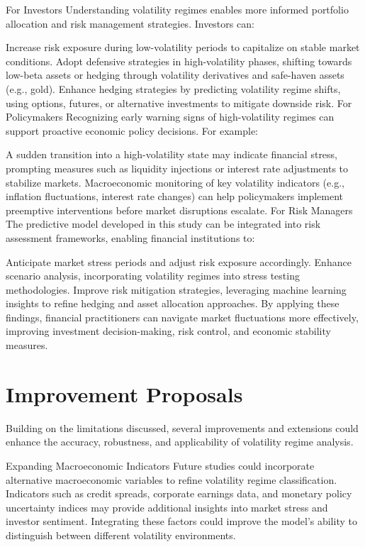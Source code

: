 For Investors
Understanding volatility regimes enables more informed portfolio allocation and risk management strategies. Investors can:

Increase risk exposure during low-volatility periods to capitalize on stable market conditions.
Adopt defensive strategies in high-volatility phases, shifting towards low-beta assets or hedging through volatility derivatives and safe-haven assets (e.g., gold).
Enhance hedging strategies by predicting volatility regime shifts, using options, futures, or alternative investments to mitigate downside risk.
For Policymakers
Recognizing early warning signs of high-volatility regimes can support proactive economic policy decisions. For example:

A sudden transition into a high-volatility state may indicate financial stress, prompting measures such as liquidity injections or interest rate adjustments to stabilize markets.
Macroeconomic monitoring of key volatility indicators (e.g., inflation fluctuations, interest rate changes) can help policymakers implement preemptive interventions before market disruptions escalate.
For Risk Managers
The predictive model developed in this study can be integrated into risk assessment frameworks, enabling financial institutions to:

Anticipate market stress periods and adjust risk exposure accordingly.
Enhance scenario analysis, incorporating volatility regimes into stress testing methodologies.
Improve risk mitigation strategies, leveraging machine learning insights to refine hedging and asset allocation approaches.
By applying these findings, financial practitioners can navigate market fluctuations more effectively, improving investment decision-making, risk control, and economic stability measures.

\section{Improvement Proposals}

Building on the limitations discussed, several improvements and extensions could enhance the accuracy, robustness, and applicability of volatility regime analysis.

Expanding Macroeconomic Indicators
Future studies could incorporate alternative macroeconomic variables to refine volatility regime classification. Indicators such as credit spreads, corporate earnings data, and monetary policy uncertainty indices may provide additional insights into market stress and investor sentiment. Integrating these factors could improve the model’s ability to distinguish between different volatility environments.


